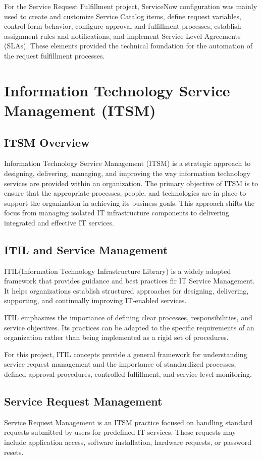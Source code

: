 \documentclass[12pt,a4paper]{report}
\begin{document}
For the Service Request Fulfillment project, ServiceNow configuration was
mainly used to create and customize Service Catalog items, define request
variables, control form behavior, configure approval and fulfillment
processes, establish assignment rules and notifications, and implement
Service Level Agreements (SLAs). These elements provided the technical
foundation for the automation of the request fulfillment processes.

\section{Information Technology Service Management (ITSM)}

\subsection{ITSM Overview}
Information Technology Service Management (ITSM) is a strategic approach to
designing, delivering, managing, and improving the way information technology
services are provided within an organization. The primary objective of ITSM is
to ensure that the appropriate processes, people, and technologies are in
place to support the organization in achieving its business goals. This
approach shifts the focus from managing isolated IT infrastructure components
to delivering integrated and effective IT services.

\subsection{ITIL and Service Management}
ITIL(Information Technology Infrastructure Library) is a widely adopted framework that provides 
guidance and best practices fir IT Service Management. It helps organizations establish structured 
approaches for designing, delivering, supporting, and continually improving IT-enabled services. 

ITIL emphasizes the importance of defining clear processes, responsibilities, and service objectives. 
Its practices can be adapted to the specific requirements of an organization rather than being implemented as a 
rigid set of procedures.

For this project, ITIL concepts provide a general framework for understanding
service request management and the importance of standardized processes,
defined approval procedures, controlled fulfillment, and service-level
monitoring.

\subsection{Service Request Management}
Service Request Management is an ITSM practice focused on handling standard
requests submitted by users for predefined IT services. These requests may
include application access, software installation, hardware requests, or
password resets.
\end{document}
